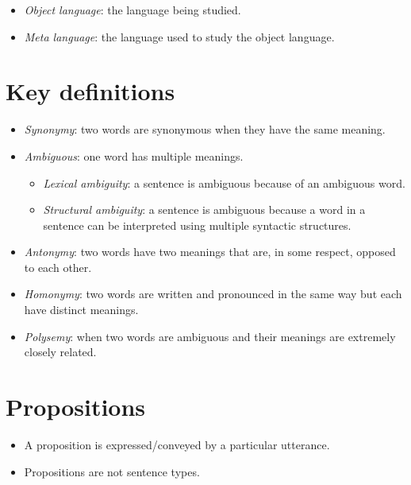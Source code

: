 \begin{definition}\leavevmode
\begin{itemize}
  \item \emph{Object language}: the language being studied.
  \item \emph{Meta language}: the language used to study the object language.
\end{itemize}
\end{definition}

\section{Key definitions}

\begin{definition}\leavevmode
\begin{itemize}
  \item \emph{Synonymy}: two words are synonymous when they have the same meaning.
  \item \emph{Ambiguous}: one word has multiple meanings.
  \begin{itemize}
    \item \emph{Lexical ambiguity}: a sentence is ambiguous because of an ambiguous word.
    \item \emph{Structural ambiguity}: a sentence is ambiguous because a word in a sentence can be interpreted using multiple syntactic structures.
  \end{itemize}
  \item \emph{Antonymy}: two words have two meanings that are, in some respect, opposed to each other.
  \item \emph{Homonymy}: two words are written and pronounced in the same way but each have distinct meanings.
  \item \emph{Polysemy}: when two words are ambiguous and their meanings are extremely closely related.
\end{itemize}
\end{definition}

\section{Propositions}

\begin{remark}\leavevmode
\begin{itemize}
  \item A proposition is expressed/conveyed by a particular utterance.
  \item Propositions are not sentence types.
\end{itemize}
\end{remark}

